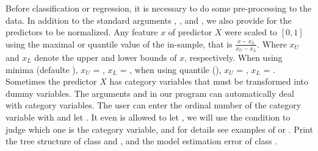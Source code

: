 \documentclass[nojss]{jss}
\numberwithin{equation}{section}
\begin{document}
Before classification or regression, it is necessary to do some pre-processing to the data. In addition to the standard arguments , , and , we also provide  for the predictors to be normalized. Any feature $x$ of predictor $X$ were scaled to $[0,1]$ using the maximal or quantile value of the in-sample, that is $\frac{x-x_{L}}{x_{U}-x_{L}}$.
Where $x_{U}$ and $x_{L}$ denote the upper and lower bounds of $x$, respectively. When using minima (defaulte ), $x_{U}$ = , $x_{L}$ = , when using quantile (), $x_{U}$ = , $x_{L}$ = .
Sometimes the predictor $X$ has category variables that must be transformed into dummy variables. The arguments  and  in our program can automatically deal with category variables. The user can enter the ordinal number of the category variable with  and let . It even is allowed to let , we will use the condition  to judge which one is the category variable, and for details see examples of  or .%
%
Print the tree structure of class  and , and the model estimation error of class .
%
\end{document}
